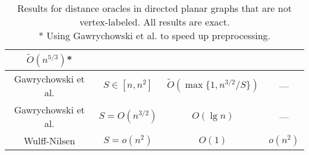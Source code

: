 \begin{table}[h!]
\begin{tabular}{c | c | c | c}
    $\tilde{O}(n^{5/3})$* \\
    \hline
    Gawrychowski et al. \cite{gawrychowski2017better} & $S\in [n, n^2]$ &
    $\tilde{O}(\max\{1, n^{3/2}/S\})$ & ---\\
    \hline
    Gawrychowski et al. \cite{gawrychowski2017better} & $S=O(n^{3/2})$ & $O(\lg n)$ & --- \\
    \hline
    Wulff-Nilsen \cite{wulff2010algorithms} & $S=o(n^2)$ & $O(1)$ & $o(n^2)$ \\
    \hline
  \end{tabular}
  \caption{Results for distance oracles in directed planar graphs that are not
    vertex-labeled. All results are exact. \\
    * Using Gawrychowski et al. \cite{gawrychowski2018voronoi} to speed up
  preprocessing.}
  \label{planarresults}
\end{table}

